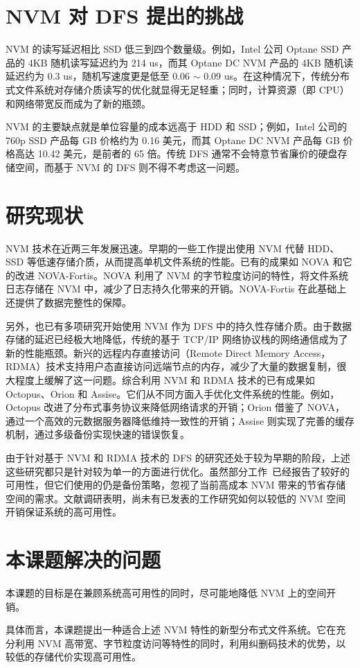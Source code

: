 \section{NVM 对 DFS 提出的挑战}
\label{sec:ch1_challenge}

NVM 的读写延迟相比 SSD 低三到四个数量级。例如，Intel 公司 Optane SSD 产品的 4KB 随机读写延迟约为 214 us\cite{optanessd}，而其 Optane DC NVM 产品的 4KB 随机读延迟约为 0.3 us，随机写速度更是低至 0.06 $\sim$ 0.09 us\cite{yang2020}。在这种情况下，传统分布式文件系统对存储介质读写的优化就显得无足轻重；同时，计算资源（即 CPU）和网络带宽反而成为了新的瓶颈。

NVM 的主要缺点就是单位容量的成本远高于 HDD 和 SSD；例如，Intel 公司的 760p SSD 产品每 GB 价格约为 0.16 美元，而其 Optane DC NVM 产品每 GB 价格高达 10.42 美元，是前者的 65 倍。传统 DFS 通常不会特意节省廉价的硬盘存储空间，而基于 NVM 的 DFS 则不得不考虑这一问题。

\section{研究现状}
\label{sec:ch1_relworks}

NVM 技术在近两三年发展迅速。早期的一些工作提出使用 NVM 代替 HDD、SSD 等低速存储介质，从而提高单机文件系统的性能。已有的成果如 NOVA\cite{nova2016} 和它的改进 NOVA-Fortis\cite{novafortis2017}。NOVA 利用了 NVM 的字节粒度访问的特性，将文件系统日志存储在 NVM 中，减少了日志持久化带来的开销。NOVA-Fortis 在此基础上还提供了数据完整性的保障。

另外，也已有多项研究开始使用 NVM 作为 DFS 中的持久性存储介质。由于数据存储的延迟已经极大地降低，传统的基于 TCP/IP 网络协议栈的网络通信成为了新的性能瓶颈。新兴的远程内存直接访问（Remote Direct Memory Access，RDMA）技术支持用户态直接访问远端节点的内存，减少了大量的数据复制，很大程度上缓解了这一问题。综合利用 NVM 和 RDMA 技术的已有成果如 Octopus\cite{octopus2017}、Orion\cite{orion2019} 和 Assise\cite{assise2019}。它们从不同方面入手优化文件系统的性能。例如，Octopus 改进了分布式事务协议来降低网络请求的开销；Orion 借鉴了 NOVA，通过一个高效的元数据服务器降低维持一致性的开销；Assise 则实现了完善的缓存机制，通过多级备份实现快速的错误恢复。

由于针对基于 NVM 和 RDMA 技术的 DFS 的研究还处于较为早期的阶段，上述这些研究都只是针对较为单一的方面进行优化。虽然部分工作~\cite{orion2019,assise2019}已经报告了较好的可用性，但它们使用的仍是备份策略，忽视了当前高成本 NVM 带来的节省存储空间的需求。文献调研表明，尚未有已发表的工作研究如何以较低的 NVM 空间开销保证系统的高可用性。

\section{本课题解决的问题}
\label{sec:ch1_thiswork}

本课题的目标是在兼顾系统高可用性的同时，尽可能地降低 NVM 上的空间开销。

具体而言，本课题提出一种适合上述 NVM 特性的新型分布式文件系统。它在充分利用 NVM 高带宽、字节粒度访问等特性的同时，利用纠删码技术的优势，以较低的存储代价实现高可用性。
